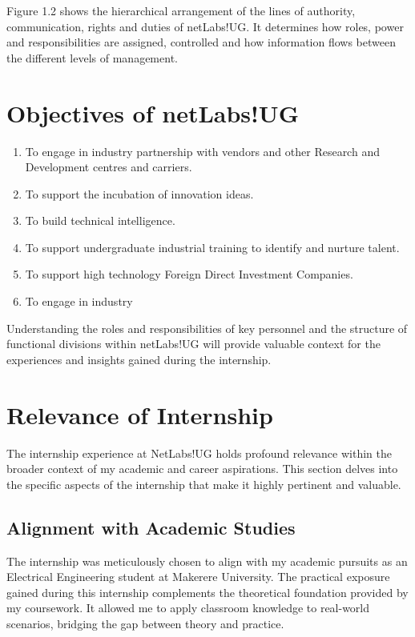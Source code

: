 Figure 1.2 shows the hierarchical arrangement of the lines of authority, communication, rights and duties of netLabs!UG. It determines how roles, power and responsibilities are assigned, controlled and how information flows between the different
levels of management.

\section{Objectives of netLabs!UG}
\begin{enumerate}
    \item To engage in industry partnership with vendors and other Research and Development centres and carriers.
    \item To support the incubation of innovation ideas.
    \item To build technical intelligence.
    \item To support undergraduate industrial training to identify and nurture talent.
    \item To support high technology Foreign Direct Investment Companies.
    \item To engage in industry
\end{enumerate}

Understanding the roles and responsibilities of key personnel and the structure of functional divisions within netLabs!UG will provide valuable context for the experiences and insights gained during the internship.

\section{Relevance of Internship}

The internship experience at NetLabs!UG holds profound relevance within the broader context of my academic and career aspirations. This section delves into the specific aspects of the internship that make it highly pertinent and valuable.

\subsection{Alignment with Academic Studies}

The internship was meticulously chosen to align with my academic pursuits as an Electrical Engineering student at Makerere University. The practical exposure gained during this internship complements the theoretical foundation provided by my coursework. It allowed me to apply classroom knowledge to real-world scenarios, bridging the gap between theory and practice.

